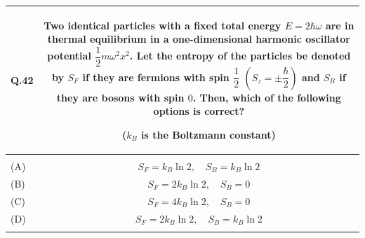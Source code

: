 \documentclass[12pt,a4paper]{article}
\begin{document}
\newpage
\vspace{0.4cm}

\begin{table}[h!]
\begin{tabular}{|L|C|}
\hline
Q.42 &
Two identical particles with a fixed total energy $E = 2\hbar\omega$ are in thermal
equilibrium in a one-dimensional harmonic oscillator potential $\dfrac{1}{2}m\omega^2 x^2$.
Let the entropy of the particles be denoted by $S_F$ if they are fermions with spin
$\dfrac{1}{2}$ $\!\left(S_z = \pm\dfrac{\hbar}{2}\right)$ and $S_B$ if they are bosons
with spin $0$. Then, which of the following options is correct?

\medskip
($k_B$ is the Boltzmann constant) \\
\hline
 & \\
\hline
(A) & $S_F = k_B \ln 2, \quad S_B = k_B \ln 2$ \\
\hline
(B) & $S_F = 2k_B \ln 2, \quad S_B = 0$ \\
\hline
(C) & $S_F = 4k_B \ln 2, \quad S_B = 0$ \\
\hline
(D) & $S_F = 2k_B \ln 2, \quad S_B = k_B \ln 2$ \\
\hline
 & \\
\hline
\end{tabular}
\end{table}

\clearpage
\end{document}
